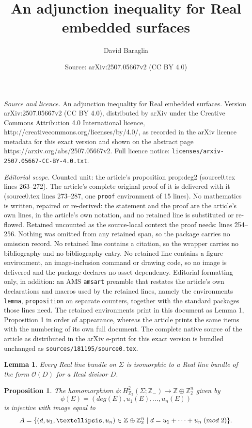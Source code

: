 \documentclass[10pt,a4paper]{amsart}
\title{An adjunction inequality for Real embedded surfaces}
\author{David Baraglia}
\date{Source: arXiv:2507.05667v2 (CC BY 4.0)}
\newtheorem{lemma}{Lemma}
\newtheorem{proposition}{Proposition}
\begin{document}
\maketitle

\noindent\emph{Source and licence.} An adjunction inequality for Real embedded surfaces. Version arXiv:2507.05667v2 (CC BY 4.0), distributed by arXiv under the Creative Commons Attribution 4.0 International licence, http://creativecommons.org/licenses/by/4.0/, as recorded in the arXiv licence metadata for this exact version and shown on the abstract page https://arxiv.org/abs/2507.05667v2. Full licence notice: \texttt{licenses/arxiv-2507.05667-CC-BY-4.0.txt}.\par\smallskip

\noindent\textit{Editorial scope.} Counted unit: the article's proposition prop:deg2 (source0.tex lines 263--272). The article's complete original proof of it is delivered with it (source0.tex lines 273--287, one \texttt{proof} environment of 15 lines). No mathematics is written, repaired or re-derived: the statement and the proof are the article's own lines, in the article's own notation, and no retained line is substituted or re-flowed.  Retained uncounted as the source-local context the proof needs: lines 254--256.  Nothing was omitted from any retained span, so the package carries no omission record.  No retained line contains a citation, so the wrapper carries no bibliography and no bibliography entry.  No retained line contains a figure environment, an image-inclusion command or drawing code, so no image is delivered and the package declares no asset dependency.  Editorial formatting only, in addition: an AMS \texttt{amsart} preamble that restates the article's own declarations and macros used by the retained lines, namely the environments \texttt{lemma}, \texttt{proposition} on separate counters, together with the standard packages those lines need.  The retained environments print in this document as Lemma 1, Proposition 1 in order of appearance, whereas the article prints the same items with the numbering of its own full document.  The complete native source of the article as distributed in the arXiv e-print for this exact version is bundled unchanged as \texttt{sources/181195/source0.tex}.
\begin{lemma}\label{lem:rdivgen}
Every Real line bundle on $\Sigma$ is isomorphic to a Real line bundle of the form $\mathcal{O}(D)$ for a Real divisor $D$.
\end{lemma}

\begin{proposition}\label{prop:deg2}
The homomorphism $\phi : H^2_{\mathbb{Z}_2}(\Sigma ; \mathbb{Z}_-) \to \mathbb{Z} \oplus \mathbb{Z}_2^n$ given by
\[
\phi(E) = ( deg(E) , u_1(E) , \dots , u_n(E))
\]
is injective with image equal to 
\[
A = \{ (d , u_1 , \dots , u_n) \in \mathbb{Z} \oplus \mathbb{Z}_2^n \; | \; d = u_1 + \cdots + u_n \; ({\rm mod} \; 2) \}.
\]
\end{proposition}
\end{document}
